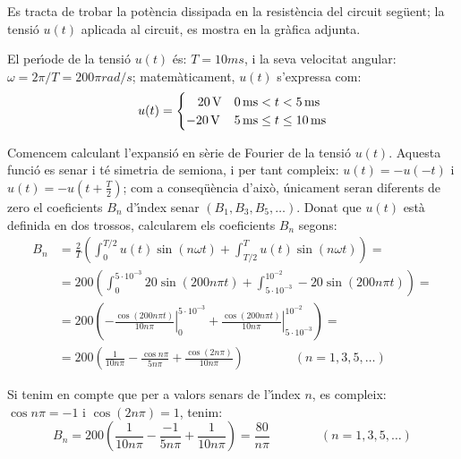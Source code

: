\begin{exemple}

 Es tracta de trobar la pot\`{e}ncia
 dissipada en la resist\`{e}ncia del circuit seg\"{u}ent; la tensi\'{o} $u(t)$ aplicada al circuit,
 es mostra en la gr\`{a}fica adjunta.

\begin{figure}[h]
\centering
    
\end{figure}

 El per\'{\i}ode de la tensi\'{o} $u(t)$ \'{e}s: $T=10\unit{ms}$, i la
seva velocitat angular: $\omega = 2\pi/T = 200\pi\unit{rad/s}$;
matem\`{a}ticament, $u(t)$ s'expressa com:
\[
u(t) = \begin{cases} \rule{3.2mm}{0pt} 20\unit{V} & 0\unit{ms} < t < 5\unit{ms} \\
       -20\unit{V} & 5\unit{ms} \leq t \leq 10\unit{ms} \end{cases}
\]

Comencem calculant l'expansi\'{o} en s\`{e}rie de Fourier de la tensi\'{o}
$u(t)$. Aquesta funci\'{o} es senar i t\'{e} simetria de semiona, i per tant
 compleix: $u(t)=-u(-t)$ i $u(t) = -u(t+\frac{T}{2})$; com a
conseq\"{u}\`{e}ncia d'aix\`{o}, \'{u}nicament seran diferents de zero el
coeficients $B_n$ d'\'{\i}ndex senar $(B_1,B_3,B_5,\ldots)$. Donat que
$u(t)$ est\`{a} definida en dos trossos, calcularem els coeficients
$B_n$ segons:
\[
\begin{split}
    B_n &= \frac{2}{T} \left( \int_0^{T/2} u(t) \sin(n \omega t) +
    \int_{T/2}^{T} u(t) \sin(n \omega t) \right) =\\[0.5ex]
    &= 200 \left( \int_0^{5\cdot 10^{-3}} 20 \sin(200 n \pi t) +
    \int_{5\cdot 10^{-3}}^{10^{-2}} -20 \sin(200 n \pi t) \right) =\\[0.5ex]
    &= 200 \left( \left. -\frac{\cos(200 n \pi t)}{10 n \pi}\right|_0^{5\cdot 10^{-3}}
    +  \left.\frac{\cos(200 n \pi t)}{10 n \pi}\right|_{5\cdot
    10^{-3}}^{10^{-2}}\right)=\\[0.5ex]
    &= 200\left( \frac{1}{10 n \pi} - \frac{\cos n \pi}{5 n \pi} +
    \frac{\cos (2 n \pi)}{10 n \pi}\right)
    \qquad\qquad(n=1,3,5,\ldots)
\end{split}
\]

Si tenim en compte que per a valors senars de l'\'{\i}ndex $n$, es
compleix: $\cos n \pi = -1$ i $\cos (2 n \pi) = 1$, tenim:
\[
    B_n = 200 \left( \frac{1}{10 n \pi} - \frac{-1}{5 n \pi} +
    \frac{1}{10 n \pi} \right) = \frac{80}{n \pi}
    \qquad\qquad(n=1,3,5,\ldots)
\]


\end{exemple}
